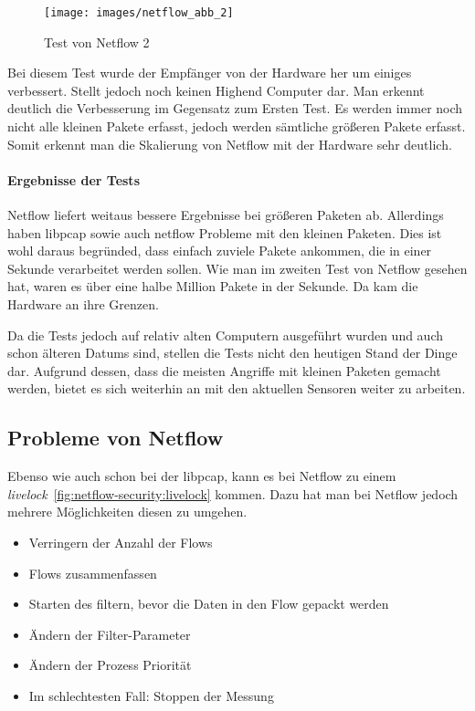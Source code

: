\begin{figure}
  \centering
  \texttt{[image: images/netflow\_abb\_2]}
  \caption{Test von Netflow 2}
  \label{fig:netflow-security:test-netflow-2}
\end{figure}

Bei diesem Test wurde der Empfänger von der Hardware her um einiges
verbessert. Stellt jedoch noch keinen Highend Computer dar. Man erkennt
deutlich die Verbesserung im Gegensatz zum Ersten Test. Es werden immer
noch nicht alle kleinen Pakete erfasst, jedoch werden sämtliche größeren
Pakete erfasst. Somit erkennt man die Skalierung von Netflow mit der
Hardware sehr deutlich.

\paragraph{Ergebnisse der Tests}

Netflow liefert weitaus bessere Ergebnisse bei größeren Paketen ab.
Allerdings haben libpcap sowie auch netflow Probleme mit den kleinen
Paketen. Dies ist wohl daraus begründed, dass einfach zuviele Pakete
ankommen, die in einer Sekunde verarbeitet werden sollen. Wie man im
zweiten Test von Netflow gesehen hat, waren es über eine halbe Million
Pakete in der Sekunde. Da kam die Hardware an ihre Grenzen. 

Da die Tests jedoch auf relativ alten Computern ausgeführt wurden und
auch schon älteren Datums sind, stellen die Tests nicht den heutigen
Stand der Dinge dar. Aufgrund dessen, dass die meisten Angriffe mit
kleinen Paketen gemacht werden, bietet es sich weiterhin an mit den
aktuellen Sensoren weiter zu arbeiten.

\subsection{Probleme von Netflow}

Ebenso wie auch schon bei der libpcap, kann es bei Netflow zu einem
\textsl{livelock}~\ref{fig:netflow-security:livelock} kommen. Dazu hat
man bei Netflow jedoch mehrere Möglichkeiten diesen zu umgehen.

\begin{itemize}
  \item Verringern der Anzahl der Flows
  \item Flows  zusammenfassen
  \item Starten des filtern, bevor die Daten in den Flow gepackt werden
  \item Ändern der Filter-Parameter
  \item Ändern der Prozess Priorität
  \item Im schlechtesten Fall: Stoppen der Messung
\end{itemize}

